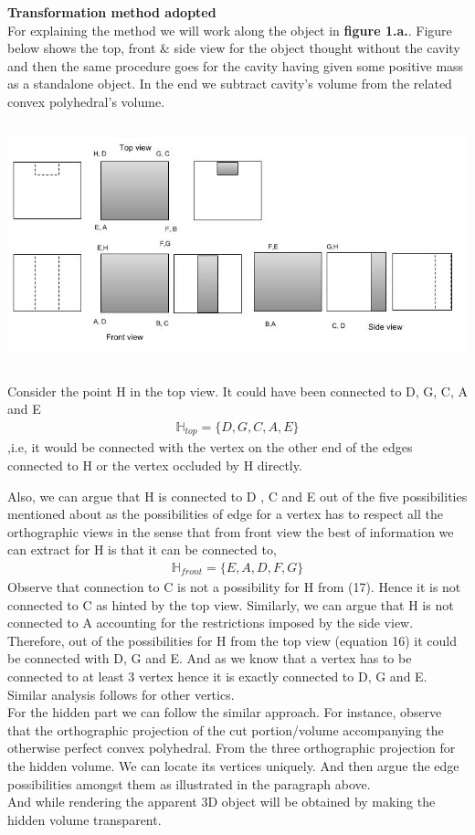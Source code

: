 \textbf{Transformation method adopted \:}\\
For explaining the method we will work along the object in \textbf{figure 1.a.}. Figure below shows the top, front \& side view for the object thought without the cavity and then the same procedure goes for the cavity having given some positive mass as a standalone object. In the end we subtract cavity's volume from the related convex polyhedral's volume. \\ 
\begin{center}
\includegraphics[height = 7cm]{aa.png}
\end{center}
Consider the point H in the top view. It could have been connected to D, G, C, A and E 
\begin{align}
\mathbb{H}_{top} = \{D, G, C, A, E\}
\end{align}
,i.e, it would be connected with the vertex on the other end of the edges connected to H or the vertex occluded by H directly.

Also, we can argue that H is connected to D , C and E out of the five possibilities mentioned about as the possibilities of edge for a vertex has to respect all the orthographic views in the sense that from front view the best of information we can extract for H is that it can be connected to,
\begin{align}
\mathbb{H}_{front} = \{E, A, D, F, G\}
\end{align}
Observe that connection to C is not a possibility for H from (17). Hence it is not connected to C as hinted by the top view. Similarly, we can argue that H is not connected to A accounting for the restrictions imposed by the side view. Therefore, out of the possibilities for H from the top view (equation 16) it could be connected with D, G and E. And as we know that a vertex has to be connected to at least 3 vertex hence it is exactly connected to D, G and E. Similar analysis follows for other vertics. \\
For the hidden part we can follow the similar approach. For instance, observe that the orthographic projection of the cut portion/volume accompanying the otherwise perfect convex polyhedral. From the three orthographic projection for the hidden volume. We can locate its vertices uniquely. And then argue the edge possibilities amongst them as illustrated in the paragraph above.\\
And while rendering the apparent 3D object will be obtained by making the hidden volume transparent. 

